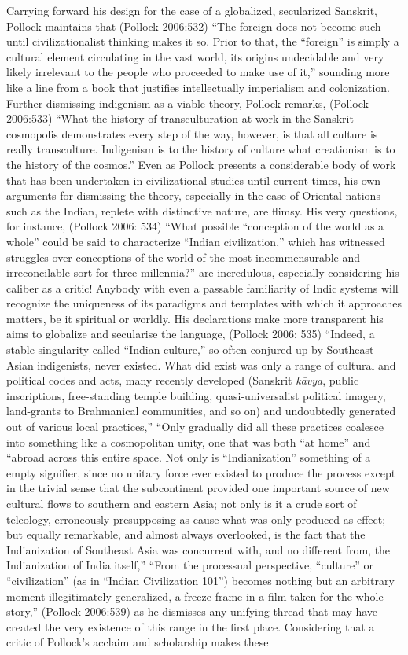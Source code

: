 Carrying forward his design for the case of a globalized, secularized Sanskrit, Pollock maintains that (Pollock 2006:532) “The foreign does not become such until civilizationalist thinking makes it so. Prior to that, the “foreign” is simply a cultural element circulating in the vast world, its origins undecidable and very likely irrelevant to the people who proceeded to make use of it,” sounding more like a line from a book that justifies intellectually imperialism and colonization. Further dismissing indigenism as a viable theory, Pollock remarks, (Pollock 2006:533) “What the history of transculturation at work in the Sanskrit cosmopolis demonstrates every step of the way, however, is that all culture is really transculture. Indigenism is to the history of culture what creationism is to the history of the cosmos.” Even as Pollock presents a considerable body of work that has been undertaken in civilizational studies until current times, his own arguments for dismissing the theory, especially in the case of Oriental nations such as the Indian, replete with distinctive nature, are flimsy. His very questions, for instance, (Pollock 2006: 534) “What possible “conception of the world as a whole” could be said to characterize “Indian civilization,” which has witnessed struggles over conceptions of the world of the most incommensurable and irreconcilable sort for three millennia?” are incredulous, especially considering his caliber as a critic! Anybody with even a passable familiarity of Indic systems will recognize the uniqueness of its paradigms and templates with which it approaches matters, be it spiritual or worldly. His declarations make more transparent his aims to globalize and secularise the language, (Pollock 2006: 535) “Indeed, a stable singularity called “Indian culture,” so often conjured up by Southeast Asian indigenists, never existed. What did exist was only a range of cultural and political codes and acts, many recently developed (Sanskrit \textit{kāvya}, public inscriptions, free-standing temple building, quasi-universalist political imagery, land-grants to Brahmanical communities, and so on) and undoubtedly generated out of various local practices,” “Only gradually did all these practices coalesce into something like a cosmopolitan unity, one that was both “at home” and “abroad across this entire space. Not only is “Indianization” something of a empty signifier, since no unitary force ever existed to produce the process except in the trivial sense that the subcontinent provided one important source of new cultural flows to southern and eastern Asia; not only is it a crude sort of teleology, erroneously presupposing as cause what was only produced as effect; but equally remarkable, and almost always overlooked, is the fact that the Indianization of Southeast Asia was concurrent with, and no different from, the Indianization of India itself,” “From the processual perspective, “culture” or “civilization” (as in “Indian Civilization 101”) becomes nothing but an arbitrary moment illegitimately generalized, a freeze frame in a film taken for the whole story,” (Pollock 2006:539) as he dismisses any unifying thread that may have created the very existence of this range in the first place. Considering that a critic of Pollock’s acclaim and scholarship makes these 